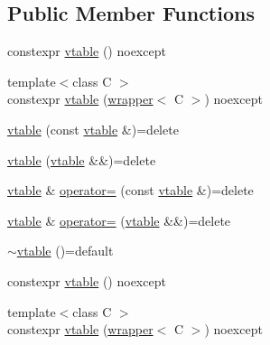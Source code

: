 \subsection*{Public Member Functions}
\begin{DoxyCompactItemize}
\item 
constexpr \hyperlink{structstdext_1_1inplace__function__detail_1_1vtable_acec966ae149e457bf0f5042974254ba4}{vtable} () noexcept
\item 
{\footnotesize template$<$class C $>$ }\\constexpr \hyperlink{structstdext_1_1inplace__function__detail_1_1vtable_ae59e9dfc5b677cbb7f9397cfc52f2b47}{vtable} (\hyperlink{structstdext_1_1inplace__function__detail_1_1wrapper}{wrapper}$<$ C $>$) noexcept
\item 
\hyperlink{structstdext_1_1inplace__function__detail_1_1vtable_abf869e5503c88d7baf3c9098f566f63e}{vtable} (const \hyperlink{structstdext_1_1inplace__function__detail_1_1vtable}{vtable} \&)=delete
\item 
\hyperlink{structstdext_1_1inplace__function__detail_1_1vtable_acd6e85bc1036c1681fcef551f9935062}{vtable} (\hyperlink{structstdext_1_1inplace__function__detail_1_1vtable}{vtable} \&\&)=delete
\item 
\hyperlink{structstdext_1_1inplace__function__detail_1_1vtable}{vtable} \& \hyperlink{structstdext_1_1inplace__function__detail_1_1vtable_a237004dd36c2a7b4b76bf94dec827fbd}{operator=} (const \hyperlink{structstdext_1_1inplace__function__detail_1_1vtable}{vtable} \&)=delete
\item 
\hyperlink{structstdext_1_1inplace__function__detail_1_1vtable}{vtable} \& \hyperlink{structstdext_1_1inplace__function__detail_1_1vtable_a92d71778c1520b8441d9cd2a313904a0}{operator=} (\hyperlink{structstdext_1_1inplace__function__detail_1_1vtable}{vtable} \&\&)=delete
\item 
\hyperlink{structstdext_1_1inplace__function__detail_1_1vtable_a9358b57ba7aa53ea5209476490644148}{$\sim$vtable} ()=default
\item 
constexpr \hyperlink{structstdext_1_1inplace__function__detail_1_1vtable_acec966ae149e457bf0f5042974254ba4}{vtable} () noexcept
\item 
{\footnotesize template$<$class C $>$ }\\constexpr \hyperlink{structstdext_1_1inplace__function__detail_1_1vtable_ae59e9dfc5b677cbb7f9397cfc52f2b47}{vtable} (\hyperlink{structstdext_1_1inplace__function__detail_1_1wrapper}{wrapper}$<$ C $>$) noexcept
\item 

\end{DoxyCompactItemize}
